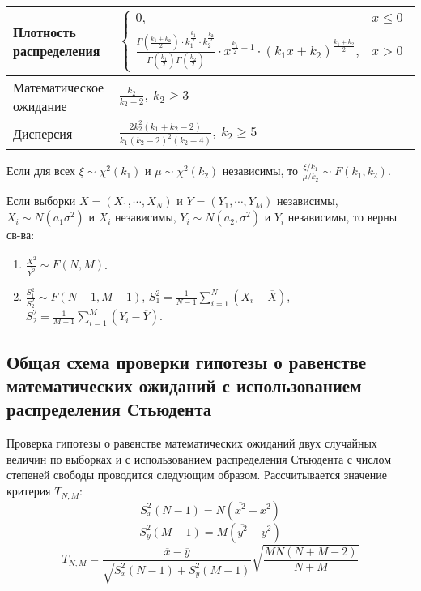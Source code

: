 \begin{table}[ht]
    \centering
    \begin{tabular}{|l|l|}
    \hline
    Плотность распределения& $\begin{cases}0,& x \leq 0\\ 
    \frac{\Gamma\left(\frac{k_1+k_2}{2}\right)\cdot k_1^{\frac{k_1}{2}}\cdot k_2^{\frac{k_2}{2}}}{\Gamma\left(\frac{k_1}{2}\right)\Gamma\left(\frac{k_2}{2}\right)}\cdot x^{\frac{k_1}{2}-1}\cdot \left(k_1x+k_2\right)^{\frac{k_1+k_2}{2}},& x > 0\end{cases}$\\
    \hline
    Математическое ожидание& $\frac{k_2}{k_2-2}, \: k_2 \geq 3$\\
    \hline
    Дисперсия& $\frac{2k_2^2\left(k_1+k_2-2\right)}{k_1(k_2-2)^2(k_2-4)}, \: k_2 \geq 5$\\
    \hline
    \end{tabular}
\end{table}

Если для всех $\xi \sim \chi^2(k_1)$ и $\mu \sim \chi^2(k_2)$ независимы, то $\frac{\xi/k_1}{\mu/k_2}\sim F(k_1, k_2)$.

Если выборки $X = \left(X_1, \cdots, X_N\right)$ и $Y = \left(Y_1, \cdots, Y_M\right)$ независимы, $X_i\sim N(a_1\sigma^2)$ и $X_i$ независимы, $Y_i \sim N(a_2, \sigma^2)$ и $Y_i$ независимы, то верны св-ва:
\begin{enumerate}
    \item $\frac{\overline{X^2}}{\overline{Y^2}} \sim F(N,M)$.
    \item $\frac{S_1^2}{S_2^2}\sim F(N-1, M-1)$, $S^2_1 = \frac{1}{N-1}\sum\limits_{i=1}^N\left(X_i - \overline{X}\right)$, $S^2_2 = \frac{1}{M-1}\sum\limits_{i=1}^M\left(Y_i - \overline{Y}\right)$.
\end{enumerate}

\subsection{Общая схема проверки гипотезы о равенстве математических ожиданий с использованием распределения Стьюдента}

Проверка гипотезы о равенстве математических ожиданий двух случайных величин по выборках и с использованием распределения Стьюдента с числом степеней свободы проводится следующим образом.
Рассчитывается значение критерия $T_{N,M}$:
$$
S^2_x(N-1) = N\left(\overline{x^2} - \overline{x}^2\right)
$$
$$
S^2_y(M-1) = M\left(\overline{y^2} - \overline{y}^2\right)
$$
$$
T_{N,M} = \frac{\overline{x} - \overline{y}}{\sqrt{S^2_x(N-1) + S^2_y(M-1)}}\sqrt{\frac{MN(N+M-2)}{N+M}}
$$

